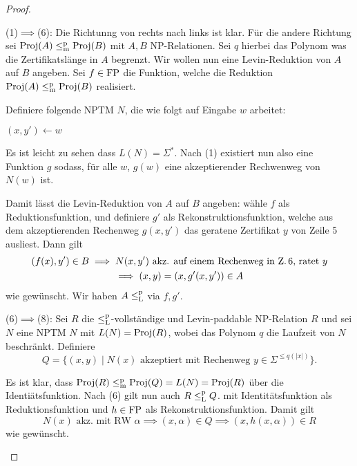 \begin{proof}
\begin{prooflist}
\item (1)$\implies$(6): Die Richtunng von rechts nach links ist klar. Für die andere Richtung sei $\operatorname{Proj}(A) \leq_\mathrm{m}^\mathrm{p} \operatorname{Proj}(B)$ mit $A,B$ NP-Relationen. Sei $q$ hierbei das Polynom was die Zertifikatslänge in $A$ begrenzt.
    Wir wollen nun eine Levin-Reduktion von $A$ auf $B$ angeben. Sei $f\in \mathrm{FP}$ die Funktion, welche die Reduktion $\operatorname{Proj}(A) \leq_\mathrm{m}^\mathrm{p} \operatorname{Proj}(B)$ realisiert.

    Definiere folgende NPTM $N$, die wie folgt auf Eingabe $w$ arbeitet: \\
    \begin{algorithm}[H]
        $(x, y')\gets w$\;
    \end{algorithm}
    Es ist leicht zu sehen dass $L(N)=\Sigma^*$. Nach (1) existiert nun also eine Funktion $g$ sodass, für alle $w$, $g(w)$ eine akzeptierender Rechwenweg von $N(w)$ ist.

    Damit lässt die Levin-Reduktion von $A$ auf $B$ angeben: wähle $f$ als Reduktionsfunktion, und definiere $g'$ als Rekonstruktionsfunktion, welche aus dem akzeptierenden Rechenweg $g(x, y')$ das geratene Zertifikat $y$ von Zeile 5 ausliest. Dann gilt
    \begin{gather*}
        (f(x), y') \in B \implies N(x, y') \text{ akz. auf einem Rechenweg in Z.\,6, ratet $y$}\\
        \implies (x,y)=(x, g'(x, y'))\in A
    \end{gather*}
    wie gewünscht. Wir haben $A\leq_\mathrm{L}^\mathrm{p}$ via $f, g'$.
\item (6)$\implies$(8): Sei $R$ die $\leq_\mathrm{L}^\mathrm{p}$-vollständige und Levin-paddable NP-Relation $R$ und sei $N$ eine NPTM $N$ mit $L(N)=\operatorname{Proj}(R)$, wobei das Polynom $q$ die Laufzeit von $N$ beschränkt.  Definiere
    \[ Q = \{ (x, y) \mid \text{$N(x)$ akzeptiert mit Rechenweg $y\in\Sigma^{\leq q(|x|)}$} \}. \]

    Es ist klar, dass $\operatorname{Proj}(R)\leq_\mathrm{m}^\mathrm{p} \operatorname{Proj}(Q)=L(N)=\operatorname{Proj}(R)$ über die Identiätsfunktion.
    Nach (6) gilt nun auch $R\leq_\mathrm{L}^\mathrm{p} Q$. mit Identitätsfunktion als Reduktionsfunktion und $h\in \mathrm{FP}$ als Rekonstruktionsfunktion.
    Damit gilt
    \[ \text{$N(x)$ akz. mit RW $\alpha$} \implies (x, \alpha)\in Q \implies (x, h(x, \alpha))\in R \]
    wie gewünscht.



\end{prooflist}
\end{proof}
